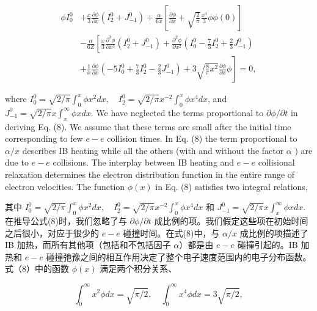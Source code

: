 \documentclass[oneside,onecolumn]{article}
\newcommand\enzhbox[2]{
  	\quad\par \begin{paracol}{2} \colseprulecolor{black} 
  			\begin{spacing}{1.0}
  				\footnotesize  #1
  			\end{spacing}
  		\switchcolumn[1] 
  		#2
  	\end{paracol} 
  }
\begin{document}
\begin{sloppypar}
{}
  
  \begin{dmath}[compact]
  \begin{aligned}
  \phi I_{0}^{0} & +\frac{x}{3} \frac{\partial \phi}{\partial x}\left(I_{2}^{0}+J_{-1}^{0}\right)+\frac{\alpha}{6 x}\left[\frac{\partial \phi}{\partial x}+\sqrt{\frac{2}{\pi}} \frac{x^{4}}{3} \phi \phi(0)\right] \\
  & -\frac{\alpha}{6 Z}\left[\frac{x}{3} \frac{\partial^{3} \phi}{\partial x^{3}}\left(I_{2}^{0}+J_{-1}^{0}\right)+\frac{\partial^{2} \phi}{\partial x^{2}}\left(I_{0}^{0}-\frac{7}{3} I_{2}^{0}+\frac{2}{3} J_{-1}^{0}\right)\right. \\
  & \left.+\frac{1}{x} \frac{\partial \phi}{\partial x}\left(-5 I_{0}^{0}+\frac{7}{3} I_{2}^{0}-\frac{2}{3} J_{-1}^{0}\right)+3 \sqrt{\frac{8}{\pi} x^{2}} \frac{\partial \phi}{\partial x} \phi\right]=0,
  \end{aligned}
  \end{dmath}
  
 
\enzhbox{   where $I_{0}^{0}=\sqrt{2 / \pi} \int_{0}^{x} \phi x^{2} d x, \quad I_{2}^{0}=\sqrt{2 / \pi} x^{-2} \int_{0}^{x} \phi x^{4} d x$, and $J_{-1}^{0}=\sqrt{2 / \pi} x \int_{x}^{\infty} \phi x d x$. We have neglected the terms proportional to $\partial \phi / \partial t$ in deriving Eq. (8). We assume that these terms are small after the initial time corresponding to few $e-e$ collision times. In Eq. (8) the term proportional to $\alpha / x$ describes IB heating while all the others (with and without the factor $\alpha$ ) are due to $e-e$ collisions. The interplay between IB heating and $e-e$ collisional relaxation determines the electron distribution function in the entire range of electron velocities. The function $\phi(x)$ in Eq. (8) satisfies two integral relations,
}{
其中 $I_{0}^{0}=\sqrt{2 / \pi} \int_{0}^{x} \phi x^{2} d x, \quad I_{2}^{0}=\sqrt{2 / \pi} x^{-2} \int_{0}^{x} \phi x^{4} d x$ 和 $J_{-1}^{0}=\sqrt{2 / \pi} x \int_{x}^{\infty} \phi x d x$.在推导公式(8)时，我们忽略了与 $\partial \phi / \partial t$ 成比例的项。我们假定这些项在初始时间之后很小，对应于很少的 $e-e$ 碰撞时间。在式(8)中，与 $\alpha / x$ 成比例的项描述了 IB 加热，而所有其他项（包括和不包括因子 $\alpha$）都是由 $e-e$ 碰撞引起的。IB 加热和 $e-e$ 碰撞弛豫之间的相互作用决定了整个电子速度范围内的电子分布函数。式（8）中的函数 $\phi(x)$ 满足两个积分关系、

}
  
  \begin{dmath}[compact]
  \int_{0}^{\infty} x^{2} \phi d x=\sqrt{\pi / 2}, \quad \int_{0}^{\infty} x^{4} \phi d x=3 \sqrt{\pi / 2},
  \end{dmath}
  

\end{sloppypar}
\end{document}
